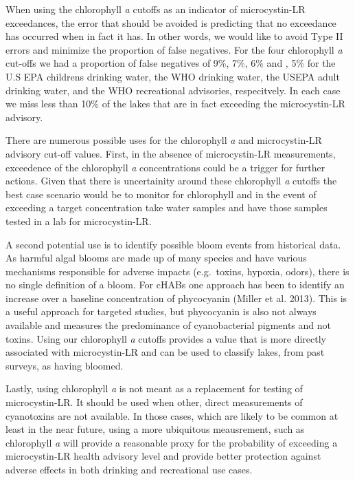 \documentclass[11pt,]{article}
\begin{document}
When using the chlorophyll \emph{a} cutoffs as an indicator of
microcystin-LR exceedances, the error that should be avoided is
predicting that no exceedance has occurred when in fact it has. In other
words, we would like to avoid Type II errors and minimize the proportion
of false negatives. For the four chlorophyll \emph{a} cut-offs we had a
proportion of false negatives of 9\%, 7\%, 6\% and , 5\% for the U.S EPA
childrens drinking water, the WHO drinking water, the USEPA adult
drinking water, and the WHO recreational advisories, respecitvely. In
each case we miss less than 10\% of the lakes that are in fact exceeding
the microcystin-LR advisory.

There are numerous possible uses for the chlorophyll \emph{a} and
microcystin-LR advisory cut-off values. First, in the absence of
microcystin-LR measurements, exceedence of the chlorophyll \emph{a}
concentrations could be a trigger for further actions. Given that there
is uncertainity around these chlorophyll \emph{a} cutoffs the best case
scenario would be to monitor for chlorophyll and in the event of
exceeding a target concentration take water samples and have those
samples tested in a lab for microcystin-LR.

A second potential use is to identify possible bloom events from
historical data. As harmful algal blooms are made up of many species and
have various mechanisms responsible for adverse impacts (e.g.~toxins,
hypoxia, odors), there is no single definition of a bloom. For cHABs one
approach has been to identify an increase over a baseline concentration
of phycocyanin (Miller et al. 2013). This is a useful approach for
targeted studies, but phycocyanin is also not always available and
measures the predominance of cyanobacterial pigments and not toxins.
Using our chlorophyll \emph{a} cutoffs provides a value that is more
directly associated with microcystin-LR and can be used to classify
lakes, from past surveys, as having bloomed.

Lastly, using chlorophyll \emph{a} is not meant as a replacement for
testing of microcystin-LR. It should be used when other, direct
measurements of cyanotoxins are not available. In those cases, which are
likely to be common at least in the near future, using a more ubiquitous
meausrement, such as chlorophyll \emph{a} will provide a reasonable
proxy for the probability of exceeding a microcystin-LR health advisory
level and provide better protection against adverse effects in both
drinking and recreational use cases.
\end{document}
